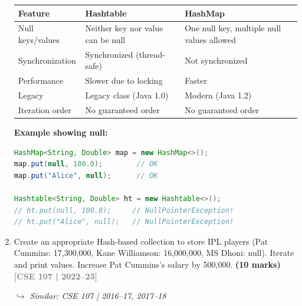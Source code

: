 \documentclass[12pt,a3paper]{article}
\newcommand{\yr}[1]{\hfill\textcolor{gray}{\small\textbf{[#1]}}}
\newcommand{\mk}[1]{\textcolor{orange!70!black}{\small\textbf{(#1 marks)}}}
\newcommand{\variant}[1]{\par\vspace{1pt}\textcolor{blue!50!black}%
  {\footnotesize\textit{$\hookrightarrow$ Similar: #1}}}
\begin{document}
\begin{enumerate}
\begin{tcolorbox}[enhanced,breakable,ansbox,
  colback=cG!4,colframe=cG,boxrule=0.8pt,arc=5pt,
  title={\textbf{Answer --- Hashtable vs HashMap}},
  fonttitle=\bfseries\color{white},colbacktitle=cG]
\begin{center}
\small
\begin{tabularx}{\linewidth}{@{}llX@{}}
\toprule
\textbf{Feature}    & \textbf{Hashtable}              & \textbf{HashMap} \\
\midrule
Null keys/values    & Neither key nor value can be null & One null key, multiple null values allowed \\
Synchronization     & Synchronized (thread-safe)        & Not synchronized \\
Performance         & Slower due to locking             & Faster \\
Legacy              & Legacy class (Java 1.0)           & Modern (Java 1.2) \\
Iteration order     & No guaranteed order               & No guaranteed order \\
\bottomrule
\end{tabularx}
\end{center}

\medskip
\textbf{Example showing null:}
\begin{lstlisting}[language=Java]
HashMap<String, Double> map = new HashMap<>();
map.put(null, 100.0);        // OK
map.put("Alice", null);      // OK

Hashtable<String, Double> ht = new Hashtable<>();
// ht.put(null, 100.0);     // NullPointerException!
// ht.put("Alice", null);   // NullPointerException!
\end{lstlisting}
\end{tcolorbox}



\item Create an appropriate Hash-based collection to store IPL players (Pat Cummins: 17{,}300{,}000, Kane Williamson: 16{,}000{,}000, MS Dhoni: null). Iterate and print values. Increase Pat Cummins's salary by 500{,}000. \mk{10}
\yr{CSE 107 | 2022--23}
\variant{CSE 107 | 2016--17, 2017--18}


\begin{tcolorbox}[enhanced,breakable,ansbox,
  colback=cG!4,colframe=cG,boxrule=0.8pt,arc=5pt,
  title={\textbf{Answer --- IPL Players HashMap (Supports null Values)}},
  fonttitle=\bfseries\color{white},colbacktitle=cG]


\end{tcolorbox}
\end{enumerate}
\end{document}
